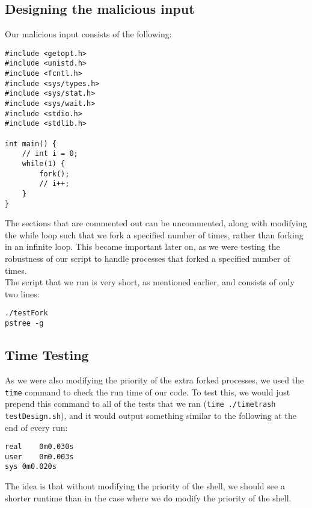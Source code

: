 \documentclass{article}
\begin{document}
\subsection{Designing the malicious input}
Our malicious input consists of the following:

\begin{lstlisting}
#include <getopt.h>
#include <unistd.h>
#include <fcntl.h>
#include <sys/types.h>
#include <sys/stat.h>
#include <sys/wait.h>
#include <stdio.h>
#include <stdlib.h>

int main() {
	// int i = 0;
	while(1) {
		fork();
		// i++;
	}
}
\end{lstlisting}
The sections that are commented out can be uncommented, along with modifying 
the while loop such that we fork a specified number of times, rather than
forking in an infinite loop. This became important later on, as we were testing
the robustness of our script to handle processes that forked a specified 
number of times. \\

The script that we run is very short, as mentioned earlier, and consists of 
only two lines:
\begin{lstlisting}
./testFork
pstree -g
\end{lstlisting}

\subsection{Time Testing}
As we were also modifying the priority of the extra forked processes, we used
the \verb+time+ command to check the run time of our code. To test this, we
would just prepend this command to all of the tests that we ran
(\verb+time ./timetrash testDesign.sh+), and it would output something similar 
to the following at the end of every run:
\begin{lstlisting}
real	0m0.030s
user	0m0.003s
sys	0m0.020s
\end{lstlisting}
The idea is that without modifying the priority of the shell, we should see a
shorter runtime than in the case where we do modify the priority of the shell.
\\

\end{document}
